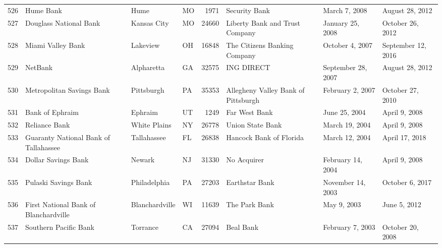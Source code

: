 \begin{tabular}{llllrlll}
526 &                                          Hume Bank &                Hume &  MO &   1971 &                                      Security Bank &       March 7, 2008 &     August 28, 2012 \\
527 &                             Douglass National Bank &         Kansas City &  MO &  24660 &                     Liberty Bank and Trust Company &    January 25, 2008 &    October 26, 2012 \\
528 &                                  Miami Valley Bank &            Lakeview &  OH &  16848 &                       The Citizens Banking Company &     October 4, 2007 &  September 12, 2016 \\
529 &                                            NetBank &          Alpharetta &  GA &  32575 &                                         ING DIRECT &  September 28, 2007 &     August 28, 2012 \\
530 &                          Metropolitan Savings Bank &          Pittsburgh &  PA &  35353 &                Allegheny Valley Bank of Pittsburgh &    February 2, 2007 &    October 27, 2010 \\
531 &                                    Bank of Ephraim &             Ephraim &  UT &   1249 &                                      Far West Bank &       June 25, 2004 &       April 9, 2008 \\
532 &                                      Reliance Bank &        White Plains &  NY &  26778 &                                   Union State Bank &      March 19, 2004 &       April 9, 2008 \\
533 &              Guaranty National Bank of Tallahassee &         Tallahassee &  FL &  26838 &                            Hancock Bank of Florida &      March 12, 2004 &      April 17, 2018 \\
534 &                                Dollar Savings Bank &              Newark &  NJ &  31330 &                                        No Acquirer &   February 14, 2004 &       April 9, 2008 \\
535 &                               Pulaski Savings Bank &        Philadelphia &  PA &  27203 &                                     Earthstar Bank &   November 14, 2003 &     October 6, 2017 \\
536 &              First National Bank of Blanchardville &      Blanchardville &  WI &  11639 &                                      The Park Bank &         May 9, 2003 &        June 5, 2012 \\
537 &                              Southern Pacific Bank &            Torrance &  CA &  27094 &                                          Beal Bank &    February 7, 2003 &    October 20, 2008 \\

\end{tabular}
